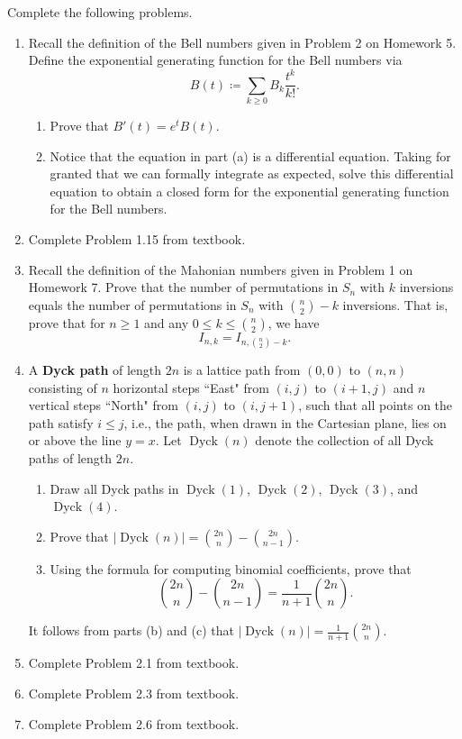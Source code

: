 \documentclass[11pt]{article}%
\theoremstyle{definition}
\DeclareMathOperator{\Dyck}{Dyck}
\begin{document}
Complete the following problems. 
\begin{enumerate}
\item Recall the definition of the Bell numbers given in Problem 2 on Homework 5. Define the exponential generating function for the Bell numbers via
\[
B(t)\coloneqq \sum_{k\geq 0}B_k\frac{t^k}{k!}.
\]
\begin{enumerate}
\item Prove that $B'(t)=e^tB(t)$.
\item Notice that the equation in part (a) is a differential equation. Taking for granted that we can formally integrate as expected, solve this differential equation to obtain a closed form for the exponential generating function for the Bell numbers.
\end{enumerate}
\item Complete Problem 1.15 from textbook.
\item Recall the definition of the Mahonian numbers given in Problem 1 on Homework 7.  Prove that the number of permutations in $S_n$ with $k$ inversions equals the number of permutations in $S_n$ with $\binom{n}{2}-k$ inversions.  That is, prove that for $n\geq 1$ and any $0\leq k\leq \binom{n}{2}$, we have
\[
I_{n,k}=I_{n,\binom{n}{2}-k}.
\]
\item A \textbf{Dyck path} of length $2n$ is a lattice path from $(0,0)$ to $(n,n)$ consisting of $n$ horizontal steps ``East" from $(i, j)$ to $(i + 1, j)$ and $n$ vertical steps ``North" from $(i, j)$ to $(i, j + 1)$, such that all points on the path satisfy $i\leq j$, i.e., the path, when drawn in the Cartesian plane, lies on or above the line $y = x$. Let $\Dyck(n)$ denote the collection of all Dyck paths of length $2n$.
 \begin{enumerate}
\item Draw all Dyck paths in $\Dyck(1)$, $\Dyck(2)$, $\Dyck(3)$, and $\Dyck(4)$.
\item Prove that $\displaystyle |\Dyck(n)|=\binom{2n}{n}-\binom{2n}{n-1}$.
\item Using the formula for computing binomial coefficients, prove that
\[
\binom{2n}{n}-\binom{2n}{n-1}=\frac{1}{n+1}\binom{2n}{n}.
\]
\end{enumerate}
It follows from parts (b) and (c) that $|\Dyck(n)|=\displaystyle \frac{1}{n+1}\binom{2n}{n}$.
\item Complete Problem 2.1 from textbook.
\item Complete Problem 2.3 from textbook.
\item Complete Problem 2.6 from textbook.
\end{enumerate}
\end{document}
